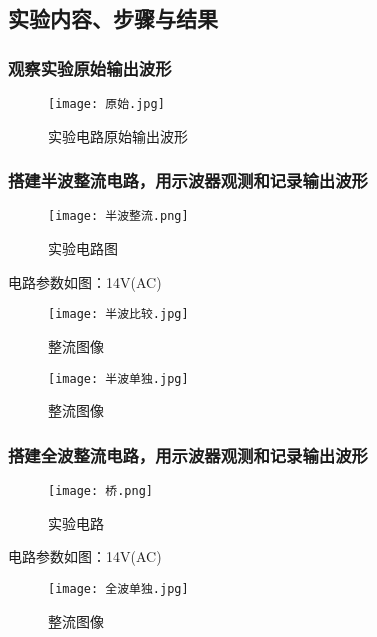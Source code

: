 \documentclass[dvipsnames, svgnames,a4paper,11pt]{article}
\begin{document}
	\subsection{实验内容、步骤与结果}
	\subsubsection{观察实验原始输出波形}
	\begin{figure}[{H}]
		\centering
		\texttt{[image: 原始.jpg]}
		\caption{实验电路原始输出波形}
		\label{}
	\end{figure}
	\subsubsection{搭建半波整流电路，用示波器观测和记录输出波形}
	\begin{figure}[{H}]
		\centering
		\texttt{[image: 半波整流.png]}
		\caption{实验电路图}
		\label{}
	\end{figure}
	电路参数如图：14V(AC)  
	\begin{figure}[{H}]
		\centering
		\texttt{[image: 半波比较.jpg]}
		\caption{整流图像}
		\label{}
	\end{figure}
	\begin{figure}[{H}]
		\centering
		\texttt{[image: 半波单独.jpg]}
		\caption{整流图像}
		\label{}
	\end{figure}
	\subsubsection{搭建全波整流电路，用示波器观测和记录输出波形}
\begin{figure}[{H}]
	\centering
	\texttt{[image: 桥.png]}
	\caption{实验电路}
	\label{}
\end{figure}
电路参数如图：14V(AC)  
\begin{figure}[{H}]
	\centering
	\texttt{[image: 全波单独.jpg]}
	\caption{整流图像}
	\label{}
\end{figure}
\end{document}
